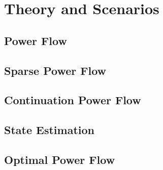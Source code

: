 \documentclass[varwidth]{standalone}
\providecommand{\powerflow}[1]{Power Flow}
\providecommand{\sparse}[1]{Sparse Power Flow}
\providecommand{\cpf}[1]{Continuation Power Flow}
\providecommand{\se}[1]{State Estimation}
\providecommand{\opf}[1]{Optimal Power Flow}
\begin{document}
\section{Theory and Scenarios}

\subsection{\powerflow{}}

\subsection{\sparse{}}

\subsection{\cpf{}}

\subsection{\se{}}

\subsection{\opf{}}
\end{document}
